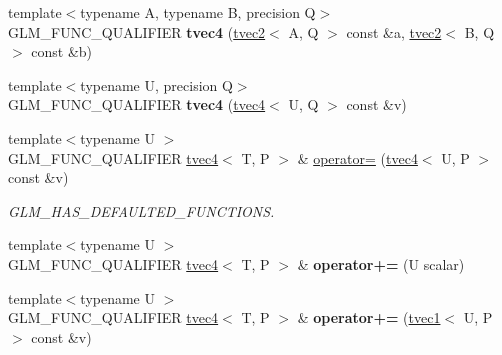 \begin{DoxyCompactItemize}
\item 
\hypertarget{structglm_1_1tvec4_accc0711dcdef73b94ddc750bfa783b90}{{\footnotesize template$<$typename A, typename B, precision Q$>$ }\\G\-L\-M\-\_\-\-F\-U\-N\-C\-\_\-\-Q\-U\-A\-L\-I\-F\-I\-E\-R {\bfseries tvec4} (\hyperlink{structglm_1_1tvec2}{tvec2}$<$ A, Q $>$ const \&a, \hyperlink{structglm_1_1tvec2}{tvec2}$<$ B, Q $>$ const \&b)}\label{structglm_1_1tvec4_accc0711dcdef73b94ddc750bfa783b90}

\item 
\hypertarget{structglm_1_1tvec4_ad65ff4f17f7dfd23a742b04c3e7bea2e}{{\footnotesize template$<$typename U, precision Q$>$ }\\G\-L\-M\-\_\-\-F\-U\-N\-C\-\_\-\-Q\-U\-A\-L\-I\-F\-I\-E\-R {\bfseries tvec4} (\hyperlink{structglm_1_1tvec4}{tvec4}$<$ U, Q $>$ const \&v)}\label{structglm_1_1tvec4_ad65ff4f17f7dfd23a742b04c3e7bea2e}

\item 
\hypertarget{structglm_1_1tvec4_a15eaeb5a1792f67622780d7c011b3dc4}{{\footnotesize template$<$typename U $>$ }\\G\-L\-M\-\_\-\-F\-U\-N\-C\-\_\-\-Q\-U\-A\-L\-I\-F\-I\-E\-R \hyperlink{structglm_1_1tvec4}{tvec4}$<$ T, P $>$ \& \hyperlink{structglm_1_1tvec4_a15eaeb5a1792f67622780d7c011b3dc4}{operator=} (\hyperlink{structglm_1_1tvec4}{tvec4}$<$ U, P $>$ const \&v)}\label{structglm_1_1tvec4_a15eaeb5a1792f67622780d7c011b3dc4}

\begin{DoxyCompactList}\small\item\em G\-L\-M\-\_\-\-H\-A\-S\-\_\-\-D\-E\-F\-A\-U\-L\-T\-E\-D\-\_\-\-F\-U\-N\-C\-T\-I\-O\-N\-S. \end{DoxyCompactList}\item 
\hypertarget{structglm_1_1tvec4_ab912e863aaeed2404176cd748aa42b67}{{\footnotesize template$<$typename U $>$ }\\G\-L\-M\-\_\-\-F\-U\-N\-C\-\_\-\-Q\-U\-A\-L\-I\-F\-I\-E\-R \hyperlink{structglm_1_1tvec4}{tvec4}$<$ T, P $>$ \& {\bfseries operator+=} (U scalar)}\label{structglm_1_1tvec4_ab912e863aaeed2404176cd748aa42b67}

\item 
\hypertarget{structglm_1_1tvec4_ac96caa0894b30459db5b4878c145977f}{{\footnotesize template$<$typename U $>$ }\\G\-L\-M\-\_\-\-F\-U\-N\-C\-\_\-\-Q\-U\-A\-L\-I\-F\-I\-E\-R \hyperlink{structglm_1_1tvec4}{tvec4}$<$ T, P $>$ \& {\bfseries operator+=} (\hyperlink{structglm_1_1tvec1}{tvec1}$<$ U, P $>$ const \&v)}\label{structglm_1_1tvec4_ac96caa0894b30459db5b4878c145977f}


\end{DoxyCompactItemize}
